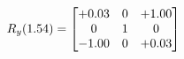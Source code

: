 \documentclass[preview]{standalone}
\begin{document}
\begin{align*}
\special{dvisvgm:raw <g id='unique000'>}R_{y}(1.54) = \begin{bmatrix}+0.03 & 0 & +1.00 \\0 & 1 & 0 \\-1.00 & 0 & +0.03\end{bmatrix}\special{dvisvgm:raw </g>}
\end{align*}
\end{document}
